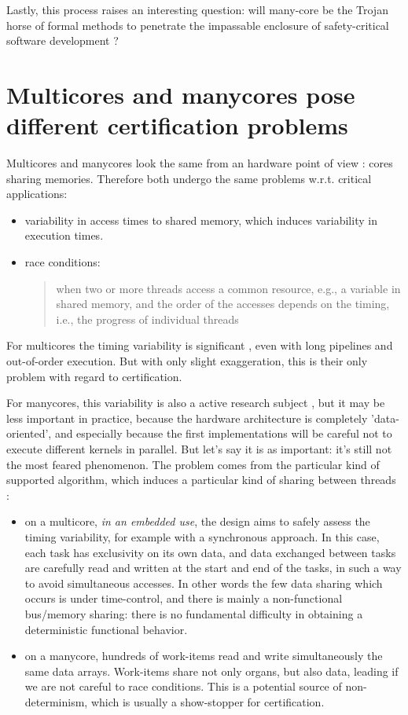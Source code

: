 \documentclass[a4paper,10pt]{article} %
\begin{document}
Lastly, this process raises an interesting question: will many-core be the Trojan horse of formal methods to penetrate the impassable enclosure of safety-critical software development ?


\section{Multicores and manycores pose different certification problems}

Multicores and manycores look the same from an hardware point of view : cores sharing memories.
Therefore both undergo the same problems w.r.t. critical applications:
\begin{itemize}
\item
variability in access times to shared memory, which induces variability in execution times.
\item
race conditions: \cite{padua2011encyclopedia}
\begin{quotation}
when two or more threads access a common resource,
e.g., a variable in shared memory, and the order of the
accesses depends on the timing, i.e., the progress of
individual threads
\end{quotation}

\end{itemize}

For multicores the timing variability is significant \cite{cullmann2010predictability}, even with long pipelines and out-of-order execution. But with only slight exaggeration, this is their only problem with regard to certification.

For manycores, this variability is also a active research subject \cite{de2020scaling}, but it may be less important in practice, because the hardware architecture is completely 'data-oriented', and especially because the first implementations will be careful not to execute different kernels in parallel.
But let's say it is as important: it's still not the most feared phenomenon.
The problem comes from the particular kind of supported algorithm, which induces a particular kind of sharing between threads :
\begin{itemize}
\item on a multicore, \emph{in an embedded use}, the design aims to safely assess the timing variability, for example with a synchronous approach.
In this case, each task has exclusivity on its own data, and data exchanged between tasks are carefully read and written at the start and end of the tasks, in such a way to avoid simultaneous accesses.
In other words the few data sharing which occurs is under time-control, and there is mainly a non-functional bus/memory sharing:
there is no fundamental difficulty in obtaining a deterministic functional behavior.
\item on a manycore, hundreds of work-items read and write simultaneously the same data arrays. Work-items share not only organs, but also data, leading if we are not careful to {race conditions}. This is a potential source of non-determinism, which is usually a show-stopper for certification.
\end{itemize}
\end{document}
